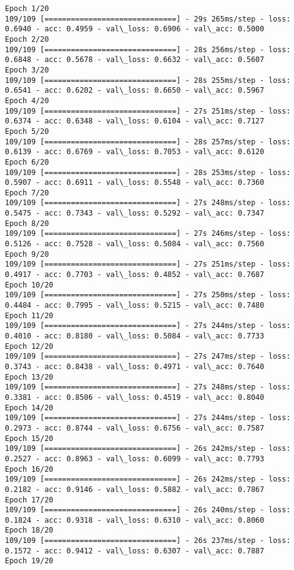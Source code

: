 \documentclass[11pt]{article}
\begin{document}
    \begin{Verbatim}[commandchars=\\\{\}]
Epoch 1/20
109/109 [==============================] - 29s 265ms/step - loss: 0.6940 - acc: 0.4959 - val\_loss: 0.6906 - val\_acc: 0.5000
Epoch 2/20
109/109 [==============================] - 28s 256ms/step - loss: 0.6848 - acc: 0.5678 - val\_loss: 0.6632 - val\_acc: 0.5607
Epoch 3/20
109/109 [==============================] - 28s 255ms/step - loss: 0.6541 - acc: 0.6202 - val\_loss: 0.6650 - val\_acc: 0.5967
Epoch 4/20
109/109 [==============================] - 27s 251ms/step - loss: 0.6374 - acc: 0.6348 - val\_loss: 0.6104 - val\_acc: 0.7127
Epoch 5/20
109/109 [==============================] - 28s 257ms/step - loss: 0.6139 - acc: 0.6769 - val\_loss: 0.7053 - val\_acc: 0.6120
Epoch 6/20
109/109 [==============================] - 28s 253ms/step - loss: 0.5907 - acc: 0.6911 - val\_loss: 0.5548 - val\_acc: 0.7360
Epoch 7/20
109/109 [==============================] - 27s 248ms/step - loss: 0.5475 - acc: 0.7343 - val\_loss: 0.5292 - val\_acc: 0.7347
Epoch 8/20
109/109 [==============================] - 27s 246ms/step - loss: 0.5126 - acc: 0.7528 - val\_loss: 0.5084 - val\_acc: 0.7560
Epoch 9/20
109/109 [==============================] - 27s 251ms/step - loss: 0.4917 - acc: 0.7703 - val\_loss: 0.4852 - val\_acc: 0.7687
Epoch 10/20
109/109 [==============================] - 27s 250ms/step - loss: 0.4484 - acc: 0.7995 - val\_loss: 0.5215 - val\_acc: 0.7480
Epoch 11/20
109/109 [==============================] - 27s 244ms/step - loss: 0.4010 - acc: 0.8180 - val\_loss: 0.5084 - val\_acc: 0.7733
Epoch 12/20
109/109 [==============================] - 27s 247ms/step - loss: 0.3743 - acc: 0.8438 - val\_loss: 0.4971 - val\_acc: 0.7640
Epoch 13/20
109/109 [==============================] - 27s 248ms/step - loss: 0.3381 - acc: 0.8506 - val\_loss: 0.4519 - val\_acc: 0.8040
Epoch 14/20
109/109 [==============================] - 27s 244ms/step - loss: 0.2973 - acc: 0.8744 - val\_loss: 0.6756 - val\_acc: 0.7587
Epoch 15/20
109/109 [==============================] - 26s 242ms/step - loss: 0.2527 - acc: 0.8963 - val\_loss: 0.6099 - val\_acc: 0.7793
Epoch 16/20
109/109 [==============================] - 26s 242ms/step - loss: 0.2182 - acc: 0.9146 - val\_loss: 0.5882 - val\_acc: 0.7867
Epoch 17/20
109/109 [==============================] - 26s 240ms/step - loss: 0.1824 - acc: 0.9318 - val\_loss: 0.6310 - val\_acc: 0.8060
Epoch 18/20
109/109 [==============================] - 26s 237ms/step - loss: 0.1572 - acc: 0.9412 - val\_loss: 0.6307 - val\_acc: 0.7887
Epoch 19/20

\end{Verbatim}
\end{document}
